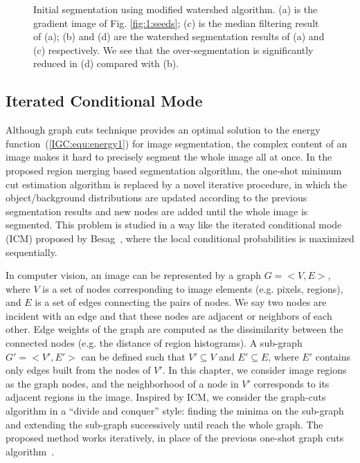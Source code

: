     \begin{figure}[htp]
    \centering
    {
    }
    \caption{Initial segmentation using modified watershed algorithm. (a) is the
    gradient image of Fig. \ref{fig:1:seeds}; (c) is the median filtering result of (a); (b) and
    (d) are the watershed segmentation results of (a) and (c) respectively. We see
    that the over-segmentation is significantly reduced in (d) compared with (b).}
    \label{IGC:fig:watershed}
    \end{figure}

\subsection{Iterated Conditional Mode}

Although graph cuts technique provides an optimal solution to the energy function~(\ref{IGC:equ:energy1}) for image segmentation, the complex content of an image makes it hard to precisely segment the whole image all at once. In the proposed region merging based segmentation algorithm, the one-shot minimum cut estimation algorithm is replaced by a novel iterative procedure, in which the object/background distributions are updated according to the previous segmentation results and new nodes are added until the whole image is segmented. This problem is studied in a way like the iterated conditional mode (ICM) proposed by Besag~\cite{ICM}, where the local conditional probabilities is maximized sequentially.

In computer vision, an image can be represented by a graph $G =<V,E>$, where $V$ is a set of nodes corresponding to image elements (e.g. pixels, regions), and $E$ is a set of edges connecting the pairs of nodes. We say two nodes are incident with an edge and that these nodes are adjacent or neighbors of each other. Edge weights of the graph are computed as the dissimilarity between the connected nodes (e.g. the distance of region histograms). A sub-graph $G'=<V',E'>$ can be defined such that $V'\subseteq V$ and $E'\subseteq E$, where $E'$ contains only edges built from the nodes of $V'$. In this chapter, we consider image regions as the graph nodes, and the neighborhood of a node in $V'$ corresponds to its adjacent regions in the image. Inspired by ICM, we consider the graph-cuts algorithm in a ``divide and conquer'' style: finding the minima on the sub-graph and extending the sub-graph successively until reach the whole graph. The proposed method works iteratively, in place of the previous one-shot graph cuts algorithm~\cite{Yuri01}.

